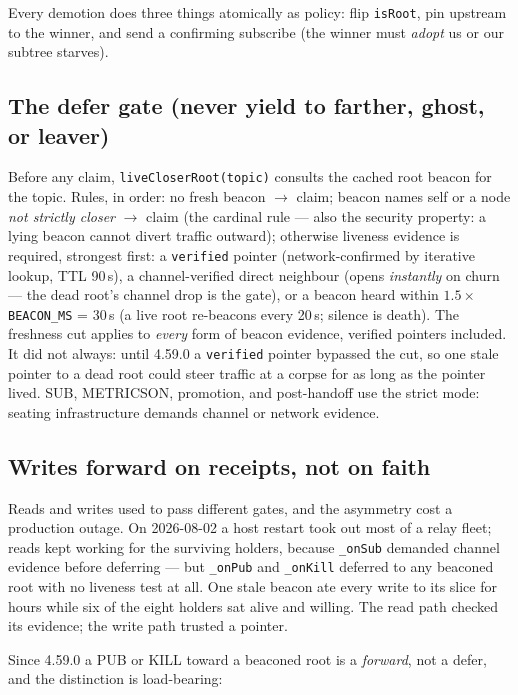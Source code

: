 \documentclass[nobib]{tufte-handout}
\begin{document}
Every demotion does three things atomically as policy: flip
\texttt{isRoot}, pin upstream to the winner, and send a confirming
subscribe (the winner must \emph{adopt} us or our subtree starves).

\subsection{The defer gate (never yield to farther, ghost, or leaver)}

Before any claim, \texttt{liveCloserRoot(topic)} consults the cached
root beacon for the topic. Rules, in order: no fresh beacon
$\rightarrow$ claim; beacon names self or a node \emph{not strictly
closer} $\rightarrow$ claim (the cardinal rule --- also the security
property: a lying beacon cannot divert traffic outward); otherwise
liveness evidence is required, strongest first: a \texttt{verified}
pointer (network-confirmed by iterative lookup, TTL 90\,s), a
channel-verified direct neighbour (opens \emph{instantly} on churn ---
the dead root's channel drop is the gate), or a beacon heard within
$1.5\times$\texttt{BEACON\_MS} = 30\,s (a live root re-beacons every
20\,s; silence is death). The freshness cut applies to \emph{every}
form of beacon evidence, verified pointers included. It did not always:
until 4.59.0 a \texttt{verified} pointer bypassed the cut, so one stale
pointer to a dead root could steer traffic at a corpse for as long as
the pointer lived. SUB, METRICSON, promotion, and post-handoff use the
strict mode: seating infrastructure demands channel or network
evidence.

\subsection{Writes forward on receipts, not on faith}

Reads and writes used to pass different gates, and the asymmetry cost a
production outage. On 2026-08-02 a host restart took out most of a
relay fleet; reads kept working for the surviving holders, because
\texttt{\_onSub} demanded channel evidence before deferring --- but
\texttt{\_onPub} and \texttt{\_onKill} deferred to any beaconed root
with no liveness test at all. One stale beacon ate every write to its
slice for hours while six of the eight holders sat alive and willing.
The read path checked its evidence; the write path trusted a pointer.

Since 4.59.0 a PUB or KILL toward a beaconed root is a
\emph{forward}, not a defer, and the distinction is load-bearing:
\end{document}
